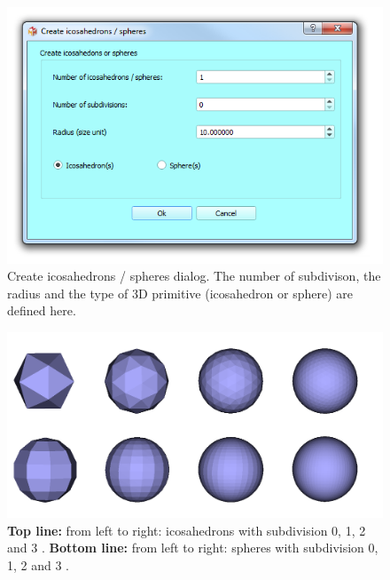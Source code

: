 \begin{figure}
  \centering
  \includegraphics[scale=0.5]{images/09/create_3D_primitives/icosahedrons_dialog.png} 
	\caption{Create icosahedrons / spheres dialog. The number of subdivison, the radius and the type of 3D primitive (icosahedron or sphere) are defined here.}
 \label{icosahedrons_dialog}
\end{figure}

\begin{figure}
  \centering
  \includegraphics[scale=0.35]{images/09/create_3D_primitives/spheric.png} 
	\caption{\textbf{Top line:} from left to right: icosahedrons with subdivision 0, 1, 2 and 3 . \textbf{Bottom line:} from left to right: spheres with subdivision 0, 1, 2 and 3 .
	}
 \label{spheric}
\end{figure}



